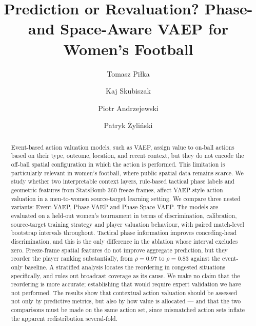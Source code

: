 \documentclass[runningheads]{llncs}
\newif\ifanonymous
\begin{document}
\title{Prediction or Revaluation? Phase- and Space-Aware VAEP for Women's Football}
\ifanonymous
  \author{Anonymous Author(s)}
  \authorrunning{Anonymous Author(s)}
  \institute{Paper under double-blind review}
\else
\author{
Tomasz Piłka \and
Kaj Skubiszak \and
Piotr Andrzejewski \and
Patryk Żyliński
}
\fi
\maketitle
\begin{abstract}
Event-based action valuation models, such as VAEP, assign value to on-ball actions based on their type, outcome, location, and recent context, but they do not encode the off-ball spatial configuration in which the action is performed. This limitation is particularly relevant in women's football, where public spatial data remains scarce. We study whether two interpretable context layers, rule-based tactical phase labels and geometric features from StatsBomb 360 freeze frames, affect VAEP-style action valuation in a men-to-women source-target learning setting.
We compare three nested variants: Event-VAEP, Phase-VAEP and Phase-Space VAEP. The models are evaluated on a held-out women's tournament in terms of discrimination, calibration, source-target training strategy and player valuation behaviour, with paired match-level bootstrap intervals throughout. Tactical phase information improves conceding-head discrimination, and this is the only difference in the ablation whose interval excludes zero. Freeze-frame spatial features do not improve aggregate prediction, but they reorder the player ranking substantially, from $\rho = 0.97$ to $\rho = 0.83$ against the event-only baseline. A stratified analysis locates the reordering in congested situations specifically, and rules out broadcast coverage as its cause. We make no claim that the reordering is more accurate; establishing that would require expert validation we have not performed. The results show that contextual action valuation should be assessed not only by predictive metrics, but also by how value is allocated --- and that the two comparisons must be made on the same action set, since mismatched action sets inflate the apparent redistribution several-fold.
\end{abstract}
\end{document}
